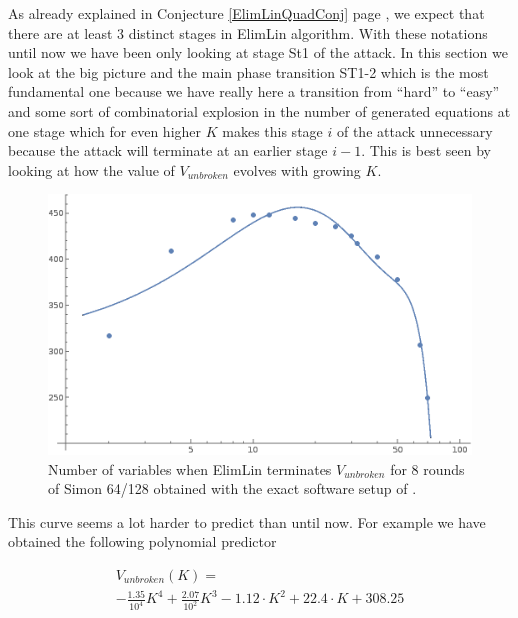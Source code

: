 As already explained in
Conjecture \ref{ElimLinQuadConj}
page
\pageref{ElimLinQuadConj},
we expect that there are at least 3 distinct stages in ElimLin algorithm.
With these notations until now we have been only looking at stage St1 of the attack.
In this section we look at the big picture and the main phase transition
ST1-2 which is the most fundamental one because we have really here a
transition from ``hard'' to ``easy'' and some sort of
combinatorial explosion in the number of generated equations at one stage
which for even higher $K$ makes this stage $i$ of the attack unnecessary
because the  attack will terminate at an earlier stage $i-1$.
This is best seen by looking at how the value of $V_{unbroken}$ evolves with growing $K$.

\begin{figure}[h!]
	\vspace{-0.2cm}
	\centering
	\includegraphics*[width=120mm]{./pics/pol4_U.png}
	 \caption{Number of variables when ElimLin terminates  $V_{unbroken}$
	 	for 8 rounds of Simon 64/128 obtained with the exact software setup
	 	of \cite{AlgteachElimLinLab}.}
	 \label{ElimLinUnrokenCurveUpDownSimon8}
	\vspace{-0.1cm}
\end{figure}

This curve seems a lot harder to predict than until now.
For example we have obtained the following polynomial predictor

\begin{multline}
V_{unbroken}(K)=\\
-\frac{1.35}{10^4}
K^4
+
\frac{2.07}{10^2}
K^3
-
1.12\cdot K^2+
22.4\cdot K + 308.25
\end{multline}

